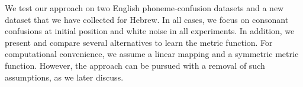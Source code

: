We test our approach on two English phoneme-confusion datasets \citep{NicelyMiller1955, Luce1987} and a new dataset that we have collected for Hebrew. In all cases, we focus on consonant confusions at initial position and white noise in all experiments. In addition, we present and compare several alternatives to learn the metric function. For computational convenience, we assume a linear mapping and a symmetric metric function. However, the approach can be pursued with a removal of such assumptions, as we later discuss.
